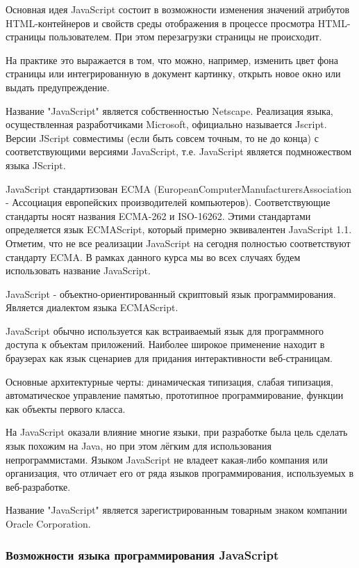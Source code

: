 Основная идея JavaScript состоит в возможности изменения значений атрибутов HTML-контейнеров и свойств среды отображения в процессе просмотра HTML-страницы пользователем. При этом перезагрузки страницы не происходит.

На практике это выражается в том, что можно, например, изменить цвет фона страницы или интегрированную в документ картинку, открыть новое окно или выдать предупреждение.

Название "JavaScript" является собственностью Netscape. Реализация языка, осуществленная разработчиками Microsoft, официально называется Jscript. Версии JScript совместимы (если быть совсем точным, то не до конца) с соответствующими версиями JavaScript, т.е. JavaScript является подмножеством языка JScript.

JavaScript стандартизован ECMA (European\-Computer\-Manufacturers\-Association - Ассоциация европейских производителей компьютеров). Соответствующие стандарты носят названия ECMA-262 и ISO-16262. Этими стандартами определяется язык ECMAScript, который примерно эквивалентен JavaScript 1.1. Отметим, что не все реализации JavaScript на сегодня полностью соответствуют стандарту ECMA. В рамках данного курса мы во всех случаях будем использовать название JavaScript.

JavaScript - объектно-ориентированный скриптовый язык программирования. Является диалектом языка ECMAScript.

JavaScript обычно используется как встраиваемый язык для программного доступа к объектам приложений. Наиболее широкое применение находит в браузерах как язык сценариев для придания интерактивности веб-страницам.

Основные архитектурные черты: динамическая типизация, слабая типизация, автоматическое управление памятью, прототипное программирование, функции как объекты первого класса.

На JavaScript оказали влияние многие языки, при разработке была цель сделать язык похожим на Java, но при этом лёгким для использования непрограммистами. Языком JavaScript не владеет какая-либо компания или организация, что отличает его от ряда языков программирования, используемых в веб-разработке.

Название "JavaScript" является зарегистрированным товарным знаком компании Oracle Corporation.

\subsubsection{Возможности языка программирования JavaScript}
\

